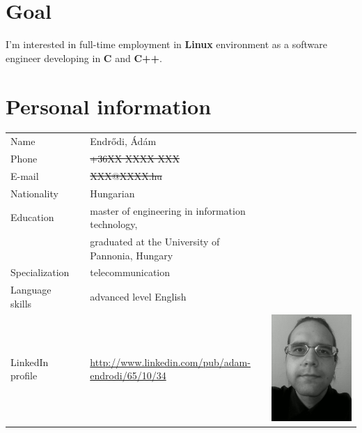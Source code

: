 \documentclass[a4paper,12pt]{article}
\newcommand\Yell{\textbf}
\begin{document}
\section{Goal}

I'm interested in full-time employment in \Yell{Linux} environment
as a software engineer developing in \Yell{C} and \Yell{C++}.

\section{Personal information}

\begin{tabularx}{\linewidth}{lXll}
Name			&& Endr\H{o}di, \'Ad\'am	&			\\
Phone			&& \sout{+36XX XXXX XXX}	&			\\
E-mail			&& \sout{XXX@XXXX.hu}		&			\\
Nationality		&& Hungarian			&			\\
Education		&& master of engineering in information technology, &	\\
			&& graduated at the University of Pannonia, Hungary &	\\
Specialization		&& telecommunication		&			\\
Language skills		&& advanced level English	&			\\
LinkedIn profile	&& \url{http://www.linkedin.com/pub/adam-endrodi/65/10/34}
			 & \includegraphics*[bb=0 0 72 1,clip=false]{me_2012}	\\
\end{tabularx}
\end{document}
